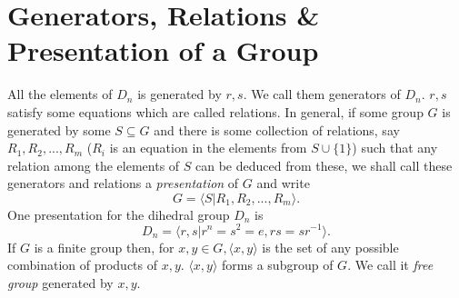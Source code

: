 \section{Generators, Relations \& Presentation of a Group}
All the elements of $D_n$ is generated by $r, s$. We call them generators of $D_n$. $r, s$ satisfy some equations which are called relations. In general, if some group $G$ is generated by some $S \subseteq G$ and there is some collection of relations, say $R_1, R_2, ..., R_m$ ($R_i$ is an equation in the elements from $S \cup \{1\}$) such that any relation among the elements of $S$ can be deduced from these, we shall call these generators and relations a \textit{presentation} of $G$ and write $$G = \langle S | R_1, R_2, ..., R_m \rangle.$$
One presentation for the dihedral group $D_n$ is $$D_n = \langle r,s | r^n = s^2 = e, rs=sr^{-1}\rangle.$$
If $G$ is a finite group then, for $x, y \in G, \langle x, y \rangle$ is the set of any possible combination of products of $x, y$. $\langle x, y \rangle$ forms a subgroup of $G$. We call it \textit{free group} generated by $x, y$.



